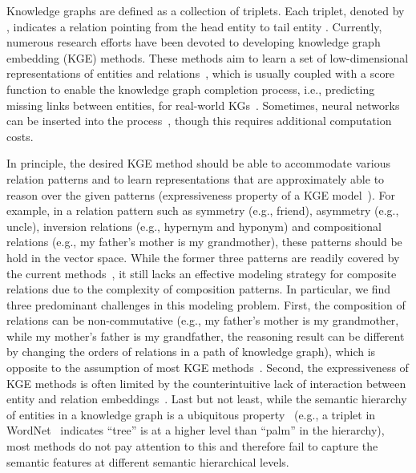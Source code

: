 \documentclass[11pt]{article}
\begin{document}
Knowledge graphs are defined as a collection of triplets. Each triplet, denoted by , indicates a relation  pointing from the head entity  to tail entity . Currently, numerous research efforts have been devoted to developing knowledge graph embedding (KGE) methods. These methods aim to learn a set of low-dimensional representations of entities and relations~\cite{ji2020survey,nguyen2017novel}, which is usually coupled with a score function to enable the knowledge graph completion process, i.e., predicting missing links between entities, for real-world KGs~\cite{nickel2016holographic, Lacroix2018CanonicalTD, bordes2013translating, sun2019rotate, zhang2019quaternion}. Sometimes, neural networks can be inserted into the process~\cite{dettmers2018convolutional,schlichtkrull2018modeling,nathani2019learning}, though this requires additional computation costs.



In principle, the desired KGE method should be able to accommodate various relation patterns and to learn representations that are approximately able to reason over the given patterns (expressiveness property of a KGE model~\cite{sun2019rotate, DBLP:journals/corr/abs-1709-04808}). 
For example, in a relation pattern such as symmetry (e.g., friend), asymmetry (e.g., uncle), inversion relations (e.g., hypernym and hyponym) and compositional relations (e.g., my father's mother is my grandmother), these patterns should be hold in the vector space.  
While the former three patterns are readily covered by the current methods~\cite{trouillon2016complex,sun2019rotate}, it still lacks an effective modeling strategy for composite relations due to the complexity of composition patterns. In particular, we find three predominant challenges in this modeling problem. First, the composition of relations can be non-commutative (e.g., my father's mother is my grandmother, while my mother's father is my grandfather, the reasoning result can be different by changing the orders of relations in a path of knowledge graph), which is opposite to the assumption of most KGE methods~\cite{bordes2013translating, sun2019rotate}. Second, the expressiveness of KGE methods is often limited by the counterintuitive lack of interaction between entity and relation embeddings~\cite{yang2014embedding}. Last but not least, while the semantic hierarchy of entities in a knowledge graph is a ubiquitous property~\cite{zhang2020learning}  (e.g., a triplet in WordNet~\cite{miller1995wordnet}  indicates ``tree'' is at a higher level than ``palm'' in the hierarchy), most methods do not pay attention to this and therefore fail to capture the semantic features at different semantic hierarchical levels.
\end{document}
